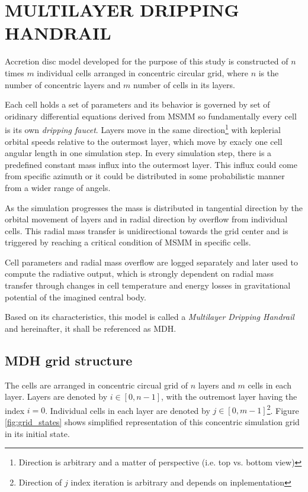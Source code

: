 \chapter{MULTILAYER DRIPPING HANDRAIL}
\thispagestyle{empty}

Accretion disc model developed for the purpose of this study is constructed of $n$ times $m$ individual cells arranged in concentric circular grid, where $n$ is the number of concentric layers and $m$ number of cells in its layers. 

Each cell holds a set of parameters and its behavior is governed by set of oridinary differential equations derived from MSMM so fundamentally every cell is its own \emph{dripping faucet}. Layers move in the same direction\footnote{Direction is arbitrary and a matter of perspective (i.e. top vs. bottom view)} with keplerial orbital speeds relative to the outermost layer, which move by exacly one cell angular length in one simulation step. In every simulation step, there is a predefined constant mass influx into the outermost layer. This influx could come from specific azimuth or it could be distributed in some probabilistic manner from a wider range of angels.

As the simulation progresses the mass is distributed in tangential direction by the orbital movement of layers and in radial direction by overflow from individual cells. This radial mass transfer is unidirectional towards the grid center and is triggered by reaching a critical condition of MSMM in specific cells. 

Cell parameters and radial mass overflow are logged separately and later used to compute the radiative output, which is strongly dependent on radial mass transfer through changes in cell temperature and energy losses in gravitational potential of the imagined central body. 

Based on its characteristics, this model is called a \emph{Multilayer Dripping Handrail} and hereinafter, it shall be referenced as MDH.

\section{MDH grid structure}

The cells are arranged in concentric circual grid of $n$ layers and $m$ cells in each layer. Layers are denoted by $i \in [0, n-1]$, with the outremost layer having the index $i = 0$. Individual cells in each layer are denoted by $j \in [0, m-1]$\footnote{Direction of $j$ index iteration is arbitrary and depends on inplementation}. Figure \ref{fig:grid_states} shows simplified representation of this concentric simulation grid in its initial state. 

